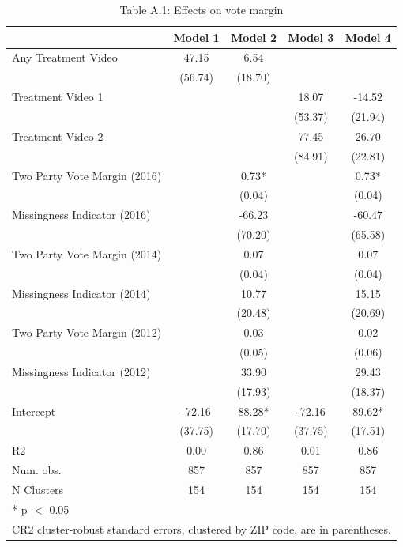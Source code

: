 \begin{table}
\centering
\caption{Table A.1: Effects on vote margin}
\centering
\begin{tabular}[t]{lcccc}
\toprule
  & Model 1 & Model 2 & Model 3 & Model 4\\
\midrule
Any Treatment Video & 47.15 & 6.54 &  & \\
 & (56.74) & (18.70) &  & \\
Treatment Video 1 &  &  & 18.07 & -14.52\\
 &  &  & (53.37) & (21.94)\\
Treatment Video 2 &  &  & 77.45 & 26.70\\
 &  &  & (84.91) & (22.81)\\
Two Party Vote Margin (2016) &  & 0.73* &  & 0.73*\\
 &  & (0.04) &  & \vphantom{1} (0.04)\\
Missingness Indicator (2016) &  & -66.23 &  & -60.47\\
 &  & (70.20) &  & (65.58)\\
Two Party Vote Margin (2014) &  & 0.07 &  & 0.07\\
 &  & (0.04) &  & (0.04)\\
Missingness Indicator (2014) &  & 10.77 &  & 15.15\\
 &  & (20.48) &  & (20.69)\\
Two Party Vote Margin (2012) &  & 0.03 &  & 0.02\\
 &  & (0.05) &  & (0.06)\\
Missingness Indicator (2012) &  & 33.90 &  & 29.43\\
 &  & (17.93) &  & (18.37)\\
Intercept & -72.16 & 88.28* & -72.16 & 89.62*\\
 & (37.75) & (17.70) & (37.75) & (17.51)\\
\midrule
R2 & 0.00 & 0.86 & 0.01 & 0.86\\
Num. obs. & 857 & 857 & 857 & 857\\
N Clusters & 154 & 154 & 154 & 154\\
\bottomrule
\multicolumn{5}{l}{\rule{0pt}{1em}* p $<$ 0.05}\\
\multicolumn{5}{l}{\rule{0pt}{1em}CR2 cluster-robust standard errors, clustered by ZIP code, are in parentheses.}\\
\end{tabular}
\end{table}
